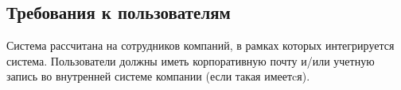 \documentclass[requirements.tex]{subfiles}
\begin{document}
\subsection{Требования к пользователям}
\par
Система рассчитана на сотрудников компаний, в рамках которых интегрируется система. Пользователи должны иметь корпоративную почту и/или учетную запись во внутренней системе компании (если такая имеетcя).
\end{document}
